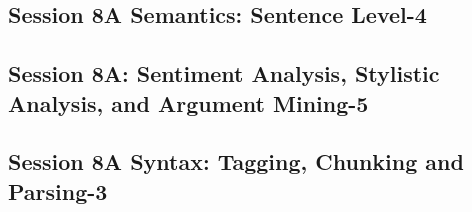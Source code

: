 \subsection{\large Session 8A Semantics: Sentence Level-4}
\label{parallel-session-8A-trackG}
\TrackGLoc\hfill\sessionchair{}{}
\clearpage
\subsection{\large Session 8A: Sentiment Analysis, Stylistic Analysis, and Argument Mining-5}
\label{parallel-session-8A-trackH}
\TrackHLoc\hfill\sessionchair{}{}
\clearpage
\subsection{\large Session 8A Syntax: Tagging, Chunking and Parsing-3}
\label{parallel-session-8A-trackI}
\TrackILoc\hfill\sessionchair{}{}
\clearpage


